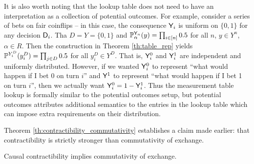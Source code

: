 It is also worth noting that the lookup table does not need to have an interpretation as a collection of potential outcomes. For example, consider a series of bets on fair coinflips -- in this case, the consequence $\mathsf{Y}_i$ is uniform on $\{0,1\}$ for any decision $\mathsf{D}_i$. Tha $D=Y=\{0,1\}$ and $\mathbb{P}_\alpha^{\mathsf{Y}_n}(y)=\prod_{i\in [n]} 0.5$ for all $n$, $y\in Y^n$, $\alpha\in R$. Then the construction in Theorem \ref{th:table_rep} yields $\mathbb{P}^{Y^D_i}(y^D_i)=\prod_{j\in D} 0.5$ for all $y^D_i\in Y^D$. That is, $\mathsf{Y}^0_i$ and $\mathsf{Y}^1_i$ are independent and uniformly distributed. However, if we wanted $\mathsf{Y}^0_i$ to represent ``what would happen if I bet 0 on turn $i$'' and $\mathsf{Y}^1$ to represent ``what would happen if I bet 1 on turn $i$'', then we actually want $\mathsf{Y}^0_i = 1-\mathsf{Y}^1_i$. Thus the measurement table lookup is formally similar to the potential outcomes setup, but potential outcomes attributes additional semantics to the entries in the lookup table which can impose extra requirements on their distribution.

Theorem \ref{th:contractibility_commutativity} establishes a claim made earlier: that contractibility is strictly stronger than commutativity of exchange.

\begin{theorem}\label{th:contractibility_commutativity}
Causal contractibility implies commutativity of exchange.
\end{theorem}

